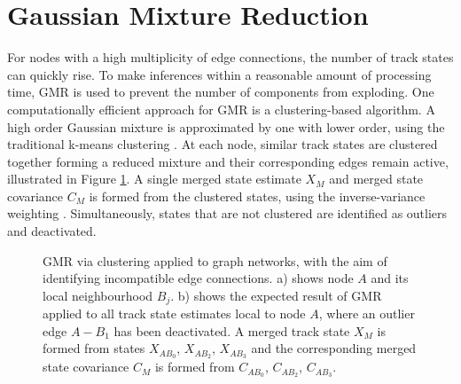 \section{Gaussian Mixture Reduction}
For nodes with a high multiplicity of edge connections, the number of track states can quickly rise. To make inferences within a reasonable amount of processing time, GMR is used to prevent the number of components from exploding. One computationally efficient approach for GMR is a clustering-based algorithm. A high order Gaussian mixture is approximated by one with lower order, using the traditional k-means clustering \cite{kmeans}. At each node, similar track states are clustered together forming a reduced mixture and their corresponding edges remain active, illustrated in Figure \ref{fig:GMR-example}. A single merged state estimate $X_{M}$ and merged state covariance $C_{M}$ is formed from the clustered states, using the inverse-variance weighting \cite{inverse-variance-weighting}. Simultaneously, states that are not clustered are identified as outliers and deactivated.

\begin{figure}[htbp!] 
    \centering
    \hfill%
    \caption{GMR via clustering applied to graph networks, with the aim of identifying incompatible edge connections. a) shows node $A$ and its local neighbourhood $B_j$. b) shows the expected result of GMR applied to all track state estimates local to node $A$, where an outlier edge $A - B_1$ has been deactivated. A merged track state $X_M$ is formed from states $X_{AB_0}$, $X_{AB_2}$, $X_{AB_3}$ and the corresponding merged state covariance $C_M$ is formed from $C_{AB_0}$, $C_{AB_2}$, $C_{AB_3}$.}
    \label{fig:GMR-example}
\end{figure}

